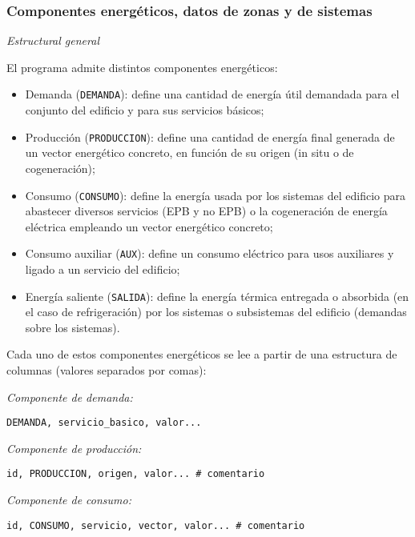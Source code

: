\documentclass[10pt,notitlepage,oneside,a4paper]{article}
\begin{document}
\subsubsection{Componentes energéticos, datos de zonas y de sistemas}\label{sec:componentesenergeticos}

\textit{Estructural general}

El programa admite distintos componentes energéticos:

\begin{itemize}
    \item Demanda (\texttt{DEMANDA}): define una cantidad de energía útil demandada para el conjunto del edificio y para sus servicios básicos;
    \item Producción (\texttt{PRODUCCION}): define una cantidad de energía final generada de un vector energético concreto, en función de su origen (in situ o de cogeneración);
    \item Consumo (\texttt{CONSUMO}): define la energía usada por los sistemas del edificio para abastecer diversos servicios (EPB y no EPB) o la cogeneración de energía eléctrica empleando un vector energético concreto;
    \item Consumo auxiliar (\texttt{AUX}): define un consumo eléctrico para usos auxiliares y ligado a un servicio del edificio;
    \item Energía saliente (\texttt{SALIDA}): define la energía térmica entregada o absorbida (en el caso de refrigeración) por los sistemas o subsistemas del edificio (demandas sobre los sistemas).
\end{itemize}

Cada uno de estos componentes energéticos se lee a partir de una estructura de columnas (valores separados por comas):

\textit{Componente de demanda:}

\begin{lstlisting}
DEMANDA, servicio_basico, valor...
\end{lstlisting}

\textit{Componente de producción:}

\begin{lstlisting}
id, PRODUCCION, origen, valor... # comentario
\end{lstlisting}

\textit{Componente de consumo:}

\begin{lstlisting}
id, CONSUMO, servicio, vector, valor... # comentario
\end{lstlisting}
\end{document}
